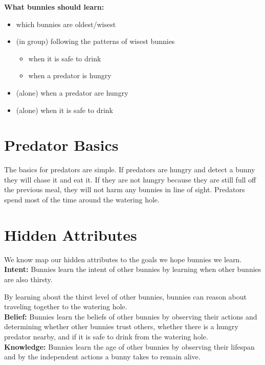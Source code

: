 \documentclass[twocolumn]{article}
\begin{document}
\noindent\textbf{What bunnies should learn:}
\begin{itemize}
    \item which bunnies are oldest/wisest
    \item (in group) following the patterns of wisest bunnies
        \begin{itemize}
            \item when it is safe to drink
            \item when a predator is hungry 
        \end{itemize}
    \item (alone) when a predator are hungry
    \item (alone) when it is safe to drink
\end{itemize}

\section{Predator Basics}

The basics for predators are simple. If predators are hungry and detect a bunny they will chase it and eat it. If they are not hungry because they are still full off the previous meal, they will not harm any bunnies in line of sight. Predators spend most of the time around the watering hole. 

\section{Hidden Attributes}

We know map our hidden attributes to the goals we hope bunnies we learn. \\

\noindent\textbf{Intent:} Bunnies learn the intent of other bunnies by learning when other bunnies are also thirsty.

By learning about the thirst level of other bunnies, bunnies can reason about traveling together to the watering hole. \\

\noindent\textbf{Belief:} Bunnies learn the beliefs of other bunnies by observing their actions and determining whether other bunnies trust others, whether there is a hungry predator nearby, and if it is safe to drink from the watering hole. \\

\noindent \textbf{Knowledge:} Bunnies learn the age of other bunnies by observing their lifespan and by the independent actions a bunny takes to remain alive. 

% 
% 
\end{document}
